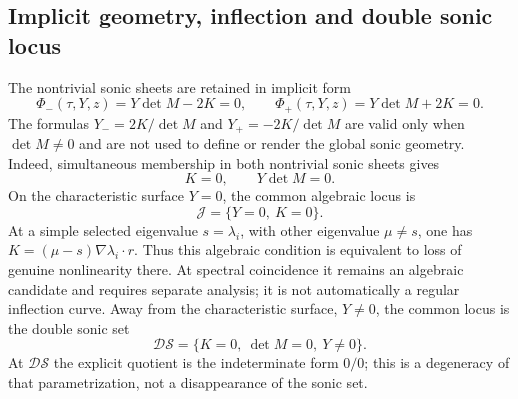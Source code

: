 \subsection{Implicit geometry, inflection and double sonic locus}
The nontrivial sonic sheets are retained in implicit form
\[
 \Phi_-(\tau,Y,z)=Y\det M-2K=0,\qquad
 \Phi_+(\tau,Y,z)=Y\det M+2K=0.
\]
The formulas $Y_-=2K/\det M$ and $Y_+=-2K/\det M$ are valid only when
$\det M\neq0$ and are not used to define or render the global sonic geometry.
Indeed, simultaneous membership in both nontrivial sonic sheets gives
\[
 K=0,\qquad Y\det M=0.
\]
On the characteristic surface $Y=0$, the common algebraic locus is
\[
 \mathcal J=\{Y=0,\ K=0\}.
\]
At a simple selected eigenvalue $s=\lambda_i$, with other eigenvalue
$\mu\ne s$, one has $K=(\mu-s)\nabla\lambda_i\cdot r$.
Thus this algebraic condition is equivalent to loss of genuine nonlinearity
there. At spectral coincidence it remains an algebraic candidate and requires
separate analysis; it is not automatically a regular inflection curve.
Away from the characteristic surface, $Y\neq0$, the common locus is the double
sonic set
\[
 \mathcal{DS}=\{K=0,\ \det M=0,\ Y\neq0\}.
\]
At $\mathcal{DS}$ the explicit quotient is the indeterminate form $0/0$; this
is a degeneracy of that parametrization, not a disappearance of the sonic set.
